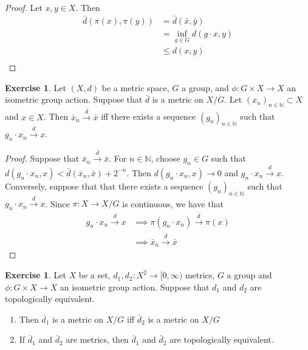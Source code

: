 \documentclass[12pt]{amsart}
\theoremstyle{definition}
\newtheorem{ex}[definition]{Exercise}
\newcommand{\N}{\mathbb{N}}
\newcommand{\Rg}{[0,\infty)}
\newcommand{\conv}[1]{\xrightarrow{#1}}
\newcommand{\lex}[1]{\label{ex:#1}}
\begin{document}
	\begin{proof}
	Let $x,y \in X$. Then
	\begin{align*}
	\bar{d}(\pi(x), \pi(y)) 
	&= \bar{d}(\bar{x}, \bar{y}) \\
	&= \inf_{g \in G} d(g \cdot x, y)\\
	& \leq d(x,y)  \\
	\end{align*}
	\end{proof}
	
	\begin{ex} \lex{}
	Let $(X, d)$ be a metric space, $G$ a group, and $\phi: G \times X \rightarrow X$ an isometric group action. Suppose that $\bar{d}$ is a metric on $X/G$. Let $(x_n)_{n \in \N} \subset X$ and $x \in X$. Then $\bar{x}_n \conv{\bar{d}} \bar{x}$ iff there exists a sequence $(g_n)_{n \in \N}$ such that $g_n \cdot x_n \conv{d} x$.
	\end{ex}
	
	\begin{proof} 
	Suppose that $\bar{x}_n \conv{\bar{d}} \bar{x}$. For $n \in \N$, choose $g_n \in G$ such that $d(g_n \cdot x_n, x) < \bar{d}(\bar{x}_n, \bar{x}) + 2^{-n}$. Then $d(g_n \cdot x_n, x) \rightarrow 0$ and $g_n \cdot x_n \conv{d} x$.  \\
	Conversely, suppose that that there exists a sequence $(g_n)_{n \in \N}$ such that $g_n \cdot x_n \conv{d} x$. Since $\pi:X \rightarrow X/G$ is continuous, we have that
	\begin{align*}
	g_n \cdot x_n \conv{d} x
	& \implies \pi(g_n \cdot x_n) \conv{\bar{d}} \pi(x)\\
	& \implies \bar{x}_n  \conv{\bar{d}} \bar{x}
	\end{align*}
	\end{proof}		
	
	\begin{ex} \lex{}
	Let $X$ be a set, $d_1, d_2: X^2 \rightarrow \Rg$ metrics, $G$ a group and $\phi: G \times X \rightarrow X$ an isometric group action. Suppose that $d_1$ and $d_2$ are topologically equivalent. 
	\begin{enumerate}
	\item Then $\bar{d}_1$ is a metric on $X/G$ iff $\bar{d}_2$ is a metric on $X/G$
	\item If $\bar{d}_1$ and $\bar{d}_2$ are metrics, then $\bar{d}_1$ and $\bar{d}_2$ are topologically equivalent. 
	\end{enumerate}
	\end{ex}
	
\end{document}
